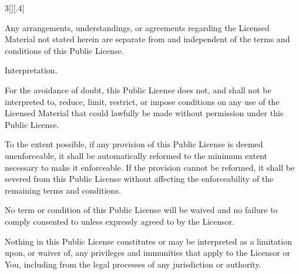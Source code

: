 \documentclass[8pt,cleardoubleempty]{scrbook}
\begin{document}
\begin{multicols}{3}[][.4\paperwidth]
\begin{longenum}
\begin{longenum}
  \item Any arrangements, understandings, or agreements regarding the
     Licensed Material not stated herein are separate from and
     independent of the terms and conditions of this Public License.

  \end{longenum}

 \item Interpretation.

  \begin{longenum}

  \item For the avoidance of doubt, this Public License does not, and
     shall not be interpreted to, reduce, limit, restrict, or impose
     conditions on any use of the Licensed Material that could lawfully
     be made without permission under this Public License.

  \item To the extent possible, if any provision of this Public License is
     deemed unenforceable, it shall be automatically reformed to the
     minimum extent necessary to make it enforceable. If the provision
     cannot be reformed, it shall be severed from this Public License
     without affecting the enforceability of the remaining terms and
     conditions.

  \item No term or condition of this Public License will be waived and no
     failure to comply consented to unless expressly agreed to by the
     Licensor.

  \item Nothing in this Public License constitutes or may be interpreted
     as a limitation upon, or waiver of, any privileges and immunities
     that apply to the Licensor or You, including from the legal
     processes of any jurisdiction or authority.

  \end{longenum}

\end{longenum}


\medskip


\end{multicols}
\end{document}
